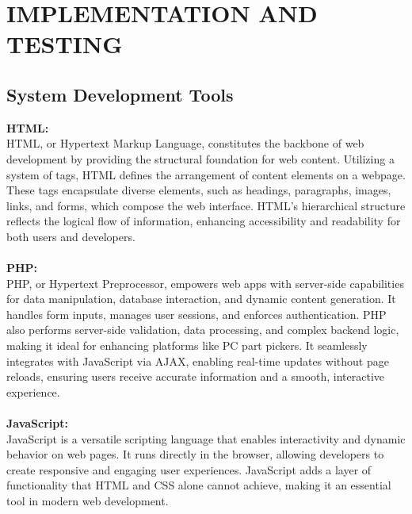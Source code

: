 \chapter{IMPLEMENTATION AND TESTING}





\section{System Development Tools}\textbf{HTML:}\\
HTML, or Hypertext Markup Language, constitutes the backbone of web development by providing the structural foundation for web content. Utilizing a system of tags, HTML defines the arrangement of content elements on a webpage. These tags encapsulate diverse elements, such as headings, paragraphs, images, links, and forms, which compose the web interface. HTML's hierarchical structure reflects the logical flow of information, enhancing accessibility and readability for both users and developers.\\\\
\textbf{PHP:}\\
PHP, or Hypertext Preprocessor, empowers web apps with server-side capabilities for data manipulation, database interaction, and dynamic content generation. It handles form inputs, manages user sessions, and enforces authentication. PHP also performs server-side validation, data processing, and complex backend logic, making it ideal for enhancing platforms like PC part pickers. It seamlessly integrates with JavaScript via AJAX, enabling real-time updates without page reloads, ensuring users receive accurate information and a smooth, interactive experience.\\\\
\textbf{JavaScript:}\\
JavaScript is a versatile scripting language that enables interactivity and dynamic behavior on web pages. It runs directly in the browser, allowing developers to create responsive and engaging user experiences. JavaScript adds a layer of functionality that HTML and CSS alone cannot achieve, making it an essential tool in modern web development.\\\\
